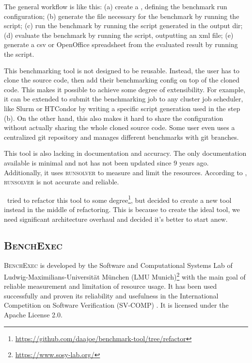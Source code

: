 The general workflow is like this:
(a) create a , defining the benchmark run configuration;
(b) generate the file necessary for the benchmark by running the  script;
(c) run the benchmark by running the script generated in the output dir;
(d) evaluate the benchmark by running the  script, outputting an xml file;
(e) generate a csv or OpenOffice spreadsheet from the evaluated result by running the  script.

This benchmarking tool is not designed to be reusable.
Instead, the user has to clone the source code, then add their benchmarking config on top of the cloned code.
This makes it possible to achieve some degree of extensibility.
For example, it can be extended to submit the benchmarking job to any cluster job scheduler, like Slurm or HTCondor by writing a specific script generation used in the step (b).
On the other hand, this also makes it hard to share the configuration without actually sharing the whole cloned source code.
Some user even uses a centralized git repository and manages different benchmarks with git branches.

This tool is also lacking in documentation and accuracy.
The only documentation available is minimal and not has not been updated since 9 years ago.
Additionally, it uses \textsc{runsolver} to measure and limit the resources.
According to \citet{beyerReliableBenchmarkingRequirements2019}, \textsc{runsolver} is not accurate and reliable.


\First~tried to refactor this tool to some degree\footnote{\href{https://github.com/daajoe/benchmark-tool/tree/refactor}{https://github.com/daajoe/benchmark-tool/tree/refactor}}, but decided to create a new tool instead in the middle of refactoring.
This is because to create the ideal tool, we need significant architecture overhaul and decided it's better to start anew.

\subsection{\textsc{BenchExec}}

\textsc{BenchExec} \citep{philipp_wendler_2019_2561835} is developed by the Software and Computational Systems Lab of Ludwig-Maximilians-Universität München (LMU Munich)\footnote{\href{https://www.sosy-lab.org/}{https://www.sosy-lab.org/}} with the main goal of reliable measurement and limitation of resource usage.
It has been used successfully and proven its reliability and usefulness in the International Competition on Software Verification (SV-COMP) \citep{beyerReliableBenchmarkingRequirements2019}.
It is licensed under the Apache License 2.0.


